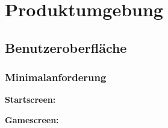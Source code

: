 \documentclass{article}
\begin{document}

\newpage
\section{Produktumgebung}\label{section-product}

\subsection{Benutzeroberfläche}

\subsubsection{Minimalanforderung}

\textbf{Startscreen:}
\begin{figure}[h]
    \centering
\end{figure}

\textbf{Gamescreen:}
\begin{figure}[h]
    \centering
\end{figure}
\end{document}
